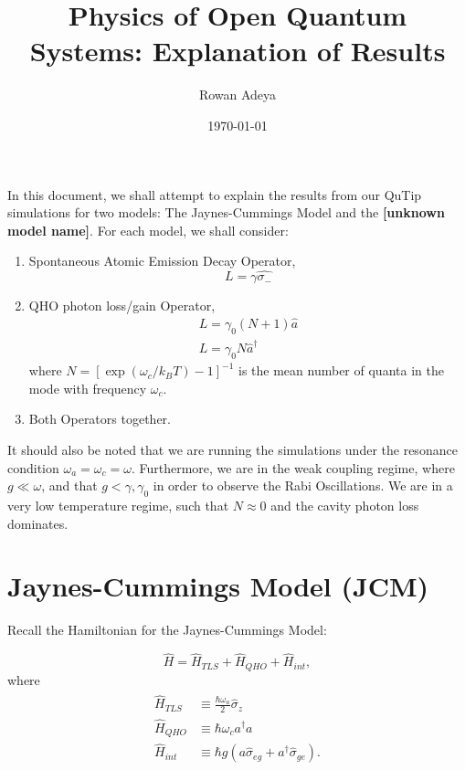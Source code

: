 \documentclass[12pt]{article}
\title{Physics of Open Quantum Systems: Explanation of Results}
\author{Rowan Adeya}
\date{\today}
\begin{document}
\maketitle

In this document, we shall attempt to explain the results from our QuTip simulations for two models: The Jaynes-Cummings Model and the {\textbf{[unknown model name]}}. For each model, we shall consider:
\begin{enumerate}
    \item Spontaneous Atomic Emission Decay Operator,
    \begin{equation}
        L = \gamma \hat{\sigma_-} \label{L_tls}
    \end{equation}
    \item QHO photon loss/gain Operator, 
        \begin{align}
            L = \gamma_0(N+1)\hat{a} \\ \label{L_qho}
            L = \gamma_0N\hat{a}^\dagger 
        \end{align}
    where 
    $N = [\exp{(\omega_c/k_BT)} -1]^{-1}$ is the mean number of quanta in the mode with frequency $\omega_c$.
    \item Both Operators together.
\end{enumerate}

It should also be noted that we are running the simulations under the resonance condition $\omega_a = \omega_c = \omega$. Furthermore, we are in the weak coupling regime, where $ g \ll \omega$, and that $g < \gamma,\gamma_0$ in order to observe the Rabi Oscillations. We are in a very low temperature regime, such that $N \approx 0$ and the cavity photon loss dominates. 

\section{Jaynes-Cummings Model (JCM)}

Recall the Hamiltonian for the Jaynes-Cummings Model:

\begin{equation}
    \hat{H} = \hat{H}_{TLS} + \hat{H}_{QHO} + \hat{H}_{int}, 
\end{equation} \label{JC_H}
where 
\begin{align*}
    \begin{aligned}
        \hat{H}_{TLS} &\equiv \frac{\hbar\omega_a}{2}\hat{\sigma}_z \\
        \hat{H}_{QHO} &\equiv \hbar\omega_ca^\dagger a \\
        \hat{H}_{int} &\equiv \hbar g(a\hat{\sigma}_{eg} + a^\dagger\hat{\sigma}_{ge}).
    \end{aligned}
\end{align*}
\end{document}
